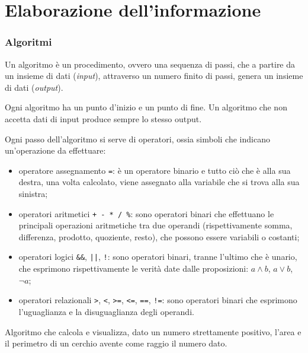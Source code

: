 \part{Elaborazione dell'informazione}


\section{Algoritmi}

Un algoritmo è un procedimento, ovvero una sequenza di passi, che a partire da un insieme di dati (\emph{input}), attraverso un numero finito di passi, genera un insieme di dati (\emph{output}).

Ogni algoritmo ha un punto d'inizio e un punto di fine.
Un algoritmo che non accetta dati di input produce sempre lo stesso output.


Ogni passo dell'algoritmo si serve di operatori, ossia simboli che indicano un'operazione da effettuare:
\begin{itemize}
  \item operatore assegnamento \verb|=|: è un operatore binario e tutto ciò che è alla sua destra, una volta calcolato, viene assegnato alla variabile che si trova alla sua sinistra;
  \item operatori aritmetici \verb|+ - * / %|: sono operatori binari che effettuano le principali operazioni aritmetiche tra due operandi (rispettivamente somma, differenza, prodotto, quoziente, resto), che possono essere variabili o costanti;
  \item operatori logici \verb|&&|, \verb!||!, \verb|!|: sono operatori binari, tranne l'ultimo che è unario, che esprimono rispettivamente le verità date dalle proposizioni: $a\wedge b$, $a\vee b$, $\lnot a$;
  \item operatori relazionali \verb|>|, \verb|<|, \verb|>=|, \verb|<=|, \verb|==|, \verb|!=|: sono operatori binari che esprimono l'uguaglianza e la disuguaglianza degli operandi. 
\end{itemize}

\begin{example}
  Algoritmo che calcola e visualizza, dato un numero strettamente positivo, l'area e il perimetro di un cerchio avente come raggio il numero dato.
  \begin{center}
  \end{center}
\end{example}


